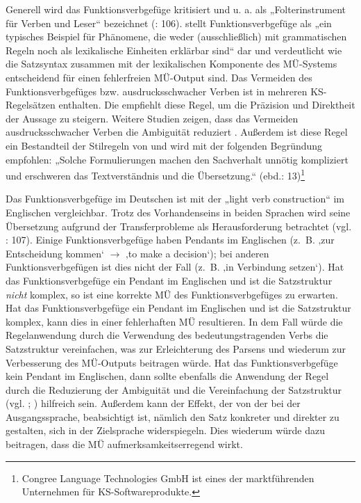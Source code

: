 Generell wird das Funktionsverbgefüge kritisiert und u. a. als „Folterinstrument für Verben und Leser“ bezeichnet (\citealt{BaumertVerhein-Jarren2012}: 106). {\citet{Heine2017} stellt} Funktionsverbgefüge als „ein typisches Beispiel für Phänomene, die weder (ausschließlich) mit grammatischen Regeln noch als lexikalische Einheiten erklärbar sind“ dar und verdeutlicht wie die Satzsyntax zusammen mit der lexikalischen Komponente des MÜ-Systems entscheidend für einen fehlerfreien MÜ-Output sind. Das Vermeiden des Funktionsverbgefüges bzw. ausdrucksschwacher Verben ist in mehreren KS-Regelsätzen enthalten. Die \citet[107]{tekom2013} empfiehlt diese Regel, um die Präzision und Direktheit der Aussage zu steigern. Weitere Studien zeigen, dass das Vermeiden ausdrucksschwacher Verben die Ambiguität reduziert \citep{Siegel2011}. Außerdem ist diese Regel ein Bestandteil der Stilregeln von \citet{Congree2018} und wird mit der folgenden Begründung empfohlen: „Solche Formulierungen machen den Sachverhalt unnötig kompliziert und erschweren das Textverständnis und die Übersetzung.“ (ebd.: 13)\footnote{{{{Congree Language Technologies GmbH ist eines der marktführenden Unternehmen für KS-Softwareprodukte.} }}}


Das Funktionsverbgefüge im Deutschen ist mit der „light verb construction“ im Englischen vergleichbar. Trotz des Vorhandenseins in beiden Sprachen wird seine Übersetzung aufgrund der Transferprobleme als Herausforderung betrachtet (vgl. \citealt{BaumertVerhein-Jarren2012}: 107). Einige Funktionsverbgefüge haben Pendants im Englischen (z.~B. ‚zur Entscheidung kommen‘ $\to$ ‚to make a decision‘); bei anderen Funktionsverbgefügen ist dies nicht der Fall (z.~B. ‚in Verbindung setzen‘). Hat das Funktionsverbgefüge ein Pendant im Englischen und ist die Satzstruktur \textit{nicht} komplex, so ist eine korrekte MÜ des Funktionsverbgefüges zu erwarten. Hat das Funktionsverbgefüge ein Pendant im Englischen und ist die Satzstruktur komplex, kann dies in einer fehlerhaften MÜ resultieren. In dem Fall würde die Regelanwendung durch die Verwendung des bedeutungstragenden Verbs die Satzstruktur vereinfachen, was zur Erleichterung des Parsens und wiederum zur Verbesserung des MÜ-Outputs beitragen würde. Hat das Funktionsverbgefüge kein Pendant im Englischen, dann sollte ebenfalls die Anwendung der Regel durch die Reduzierung der Ambiguität und die Vereinfachung der Satzstruktur (vgl. \citealt{Siegel2011}; \citealt{Congree2018}) hilfreich sein. Außerdem kann der Effekt, der von der \citet[107]{tekom2013} bei der Ausgangssprache, beabsichtigt ist, nämlich den Satz konkreter und direkter zu gestalten, sich in der Zielsprache widerspiegeln. Dies wiederum würde dazu beitragen, dass die MÜ aufmerksamkeitserregend wirkt.

